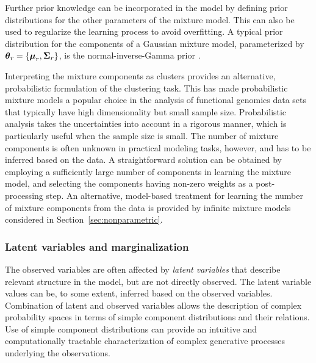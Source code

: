 Further prior knowledge can be incorporated in the model by defining
prior distributions for the other parameters of the mixture
model. This can also be used to regularize the learning process to
avoid overfitting.  A typical prior distribution for the components of
a Gaussian mixture model, parameterized by \(\boldsymbol{\theta}_r = \{\boldsymbol{\mu}_r,
\boldsymbol{\Sigma}_r\}\), is the normal-inverse-Gamma prior \citep[see
e.g.][]{Gelman03}.

Interpreting the mixture components as clusters provides an
alternative, probabilistic formulation of the clustering task. This
has made probabilistic mixture models a popular choice in the analysis
of functional genomics data sets that typically have high
dimensionality but small sample size.  Probabilistic analysis takes
the uncertainties into account in a rigorous manner, which is
particularly useful when the sample size is small. The number of
mixture components is often unknown in practical modeling tasks,
however, and has to be inferred based on the data. A straightforward
solution can be obtained by employing a sufficiently large number of
components in learning the mixture model, and selecting the components
having non-zero weights as a post-processing step. An alternative,
model-based treatment for learning the number of mixture components
from the data is provided by infinite mixture models considered in
Section~\ref{sec:nonparametric}.


\subsubsection{Latent variables and marginalization}

The observed variables are often affected by {\it latent variables}
that describe relevant structure in the model, but are not directly
observed. The latent variable values can be, to some extent, inferred
based on the observed variables. Combination of latent and observed
variables allows the description of complex probability spaces in
terms of simple component distributions and their relations. Use of
simple component distributions can provide an intuitive and
computationally tractable characterization of complex generative
processes underlying the observations.

